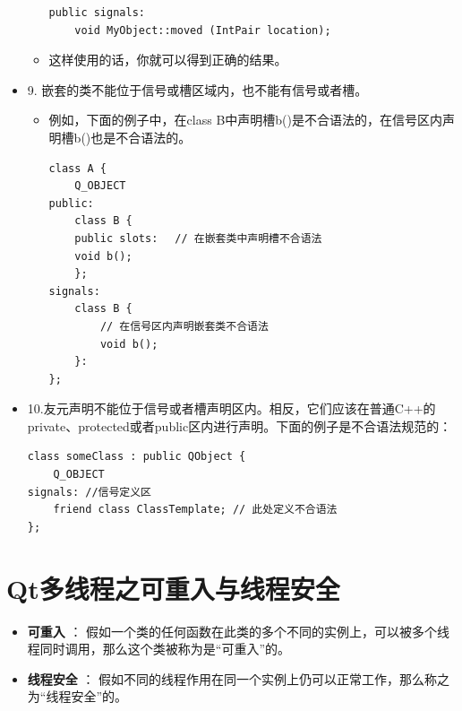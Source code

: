 \documentclass[9pt,b5paper]{article}
\begin{document}
\begin{itemize}
\begin{itemize}
\begin{lstlisting}
public signals:  
    void MyObject::moved (IntPair location);
\end{lstlisting}
\item 这样使用的话，你就可以得到正确的结果。
\end{itemize}
\item 9. 嵌套的类不能位于信号或槽区域内，也不能有信号或者槽。
\begin{itemize}
\item 例如，下面的例子中，在class B中声明槽b()是不合语法的，在信号区内声明槽b()也是不合语法的。
\lstset{language=java,label= ,caption= ,numbers=none}
\begin{lstlisting}
class A {  
    Q_OBJECT  
public:  
    class B {  
    public slots:　 // 在嵌套类中声明槽不合语法  
    void b();  
    };  
signals:  
    class B {  
        // 在信号区内声明嵌套类不合语法  
        void b();  
    }:  
};
\end{lstlisting}
\end{itemize}
\item 10.友元声明不能位于信号或者槽声明区内。相反，它们应该在普通C++的private、protected或者public区内进行声明。下面的例子是不合语法规范的：
\lstset{language=java,label= ,caption= ,numbers=none}
\begin{lstlisting}
class someClass : public QObject {  
    Q_OBJECT  
signals: //信号定义区  
    friend class ClassTemplate; // 此处定义不合语法
};
\end{lstlisting}
\end{itemize}

\section{Qt多线程之可重入与线程安全}
\label{sec-2}
\begin{itemize}
\item \textbf{可重入} ： 假如一个类的任何函数在此类的多个不同的实例上，可以被多个线程同时调用，那么这个类被称为是“可重入”的。
\item \textbf{线程安全} ： 假如不同的线程作用在同一个实例上仍可以正常工作，那么称之为“线程安全”的。
\end{itemize}
\end{document}
